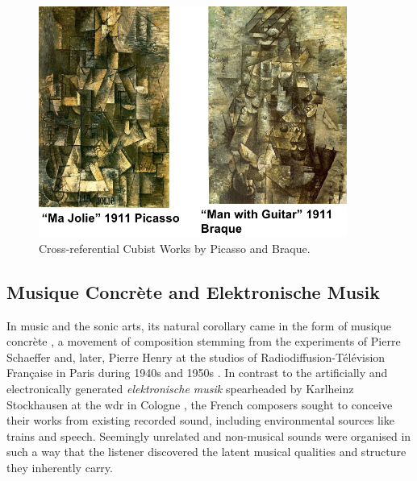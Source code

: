 \begin{figure}
	\begin{center}
		\includegraphics[width=0.9\textwidth]{ch04_sota/figures/picasso.png}
	\end{center}
	\caption[Cross-referential Cubist Works by Picasso and Braque]{Cross-referential Cubist Works by Picasso and Braque.}
	\label{fig:picasso}
\end{figure}
\subsection{Musique Concrète and Elektronische Musik}

In music and the sonic arts, its natural corollary came in the form of musique concrète \citep{Holmes2008}, a movement of composition stemming from the experiments of Pierre Schaeffer and, later, Pierre Henry at the studios of Radiodiffusion-Télévision Française in Paris during 1940s and 1950s \citep{Battier2007a}. In contrast to the artificially and electronically generated \textit{elektronische musik} spearheaded by Karlheinz Stockhausen at the \acrshort{wdr} in Cologne \citep{Collins2011a, Bates2009}, the French composers sought to conceive their works from existing recorded sound, including environmental sources like trains and speech. Seemingly unrelated and non-musical sounds were organised in such a way that the listener discovered the latent musical qualities and structure they inherently carry.

